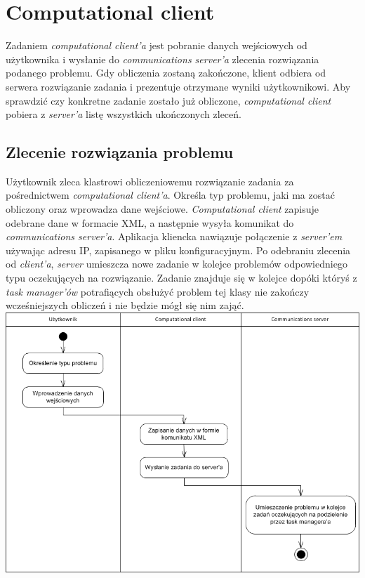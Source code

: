 \documentclass[12pt,a4paper,titlepage]{report}
\begin{document}
	\chapter{Computational client}
	Zadaniem \emph{computational client'a} jest pobranie danych wejściowych od użytkownika i wysłanie do \emph{communications server'a} zlecenia rozwiązania podanego problemu. Gdy obliczenia zostaną zakończone, klient odbiera od serwera rozwiązanie zadania i prezentuje otrzymane wyniki użytkownikowi. Aby sprawdzić czy konkretne zadanie zostało już obliczone, \emph{computational client} pobiera z \emph{server'a} listę wszystkich ukończonych zleceń.\\
	
	\section{Zlecenie rozwiązania problemu}
	Użytkownik zleca klastrowi obliczeniowemu rozwiązanie zadania za pośrednictwem \emph{computational client'a}. Określa typ problemu, jaki ma zostać obliczony oraz wprowadza dane wejściowe. \emph{Computational client} zapisuje odebrane dane w formacie XML, a następnie wysyła komunikat do \emph{communications server'a}. Aplikacja kliencka nawiązuje połączenie z \emph{server'em} używając adresu IP, zapisanego w pliku konfiguracyjnym. Po odebraniu zlecenia od \emph{client'a}, \emph{server} umieszcza nowe zadanie w kolejce problemów odpowiedniego typu oczekujących na rozwiązanie. Zadanie znajduje się w kolejce dopóki któryś z \emph{task manager'ów} potrafiących obsłużyć problem tej klasy nie zakończy wcześniejszych obliczeń i nie będzie mógł się nim zająć.\\
	
	\includegraphics[width=\textwidth]{img/activityDiagramClient1.png}
	
\end{document}
